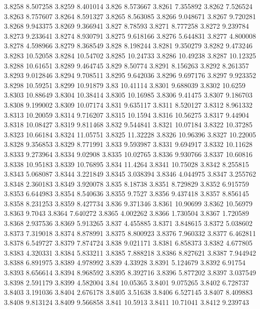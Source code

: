 3.8258  8.507258
3.8259  8.401014
3.826  8.573667
3.8261  7.355892
3.8262  7.526524
3.8263  8.757607
3.8264  8.591327
3.8265  8.563085
3.8266  9.048671
3.8267  9.720281
3.8268  9.943375
3.8269  9.366941
3.827  8.78593
3.8271  8.777258
3.8272  9.239784
3.8273  9.233641
3.8274  8.930791
3.8275  9.618166
3.8276  5.644831
3.8277  4.800008
3.8278  4.598966
3.8279  8.368549
3.828  8.198244
3.8281  9.350279
3.8282  9.473246
3.8283  10.52058
3.8284  10.54702
3.8285  10.24733
3.8286  10.49238
3.8287  10.12325
3.8288  10.61651
3.8289  9.464745
3.829  8.50774
3.8291  8.156263
3.8292  8.261357
3.8293  9.012846
3.8294  9.708511
3.8295  9.642036
3.8296  9.697176
3.8297  9.923352
3.8298  10.59251
3.8299  10.91879
3.83  10.41114
3.8301  9.688039
3.8302  10.6259
3.8303  10.88649
3.8304  10.38414
3.8305  10.16985
3.8306  9.41475
3.8307  9.186703
3.8308  9.199002
3.8309  10.07174
3.831  9.635117
3.8311  8.520127
3.8312  8.961332
3.8313  10.20059
3.8314  9.716207
3.8315  10.1594
3.8316  10.56275
3.8317  9.44904
3.8318  10.08427
3.8319  9.811468
3.832  9.544841
3.8321  10.07184
3.8322  10.37285
3.8323  10.66184
3.8324  11.05751
3.8325  11.32228
3.8326  10.96396
3.8327  10.22005
3.8328  9.356853
3.8329  8.771991
3.833  9.593987
3.8331  9.694917
3.8332  10.11628
3.8333  9.273964
3.8334  9.02908
3.8335  10.02765
3.8336  9.930766
3.8337  10.60816
3.8338  10.95183
3.8339  10.76895
3.834  11.4264
3.8341  10.75028
3.8342  8.255815
3.8343  5.068087
3.8344  3.221849
3.8345  3.038394
3.8346  4.044975
3.8347  3.255762
3.8348  2.360183
3.8349  3.920078
3.835  8.18738
3.8351  8.729829
3.8352  6.915759
3.8353  6.644983
3.8354  8.540636
3.8355  9.7527
3.8356  9.437418
3.8357  8.856145
3.8358  8.231253
3.8359  8.427734
3.836  9.371346
3.8361  10.90699
3.8362  10.56979
3.8363  9.7043
3.8364  7.640272
3.8365  4.002262
3.8366  1.730504
3.8367  1.720589
3.8368  2.937536
3.8369  5.913265
3.837  4.455885
3.8371  3.848615
3.8372  5.038602
3.8373  7.319018
3.8374  8.878991
3.8375  8.800923
3.8376  7.960332
3.8377  6.462811
3.8378  6.549727
3.8379  7.874724
3.838  9.021171
3.8381  6.858373
3.8382  4.677805
3.8383  4.320331
3.8384  5.833211
3.8385  7.888218
3.8386  8.827621
3.8387  7.944942
3.8388  6.891975
3.8389  4.978992
3.839  4.33928
3.8391  5.124679
3.8392  6.91754
3.8393  8.656614
3.8394  8.968592
3.8395  8.392716
3.8396  5.877202
3.8397  3.037549
3.8398  2.591179
3.8399  4.582004
3.84  10.05365
3.8401  9.075265
3.8402  6.728737
3.8403  3.191036
3.8404  2.676178
3.8405  3.51638
3.8406  6.527145
3.8407  8.409883
3.8408  9.813124
3.8409  9.566858
3.841  10.5913
3.8411  10.71041
3.8412  9.239743
